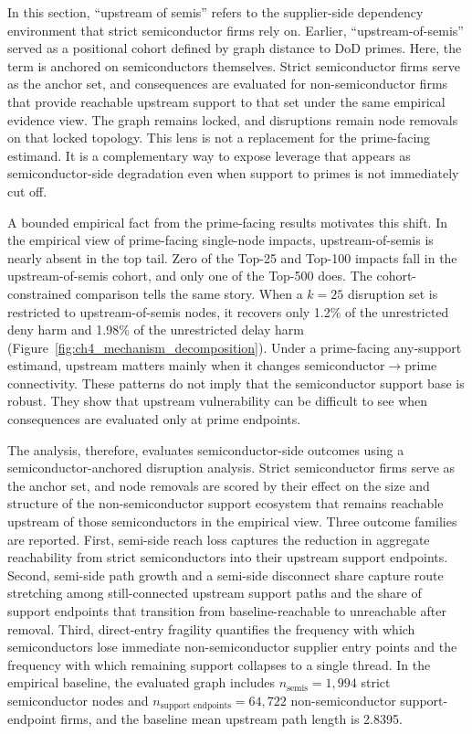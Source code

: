 In this section, ``upstream of semis'' refers to the supplier-side dependency environment that strict semiconductor firms rely on. Earlier, ``upstream-of-semis'' served as a positional cohort defined by graph distance to DoD primes. Here, the term is anchored on semiconductors themselves. Strict semiconductor firms serve as the anchor set, and consequences are evaluated for non-semiconductor firms that provide reachable upstream support to that set under the same empirical evidence view. The graph remains locked, and disruptions remain node removals on that locked topology. This lens is not a replacement for the prime-facing estimand. It is a complementary way to expose leverage that appears as semiconductor-side degradation even when support to primes is not immediately cut off.

A bounded empirical fact from the prime-facing results motivates this shift. In the empirical view of prime-facing single-node impacts, upstream-of-semis is nearly absent in the top tail. Zero of the Top-25 and Top-100 impacts fall in the upstream-of-semis cohort, and only one of the Top-500 does. The cohort-constrained comparison tells the same story. When a $k=25$ disruption set is restricted to upstream-of-semis nodes, it recovers only 1.2\% of the unrestricted deny harm and 1.98\% of the unrestricted delay harm (Figure~\ref{fig:ch4_mechanism_decomposition}). Under a prime-facing any-support estimand, upstream matters mainly when it changes semiconductor$\rightarrow$prime connectivity. These patterns do not imply that the semiconductor support base is robust. They show that upstream vulnerability can be difficult to see when consequences are evaluated only at prime endpoints.

The analysis, therefore, evaluates semiconductor-side outcomes using a semiconductor-anchored disruption analysis. Strict semiconductor firms serve as the anchor set, and node removals are scored by their effect on the size and structure of the non-semiconductor support ecosystem that remains reachable upstream of those semiconductors in the empirical view. Three outcome families are reported. First, semi-side reach loss captures the reduction in aggregate reachability from strict semiconductors into their upstream support endpoints. Second, semi-side path growth and a semi-side disconnect share capture route stretching among still-connected upstream support paths and the share of support endpoints that transition from baseline-reachable to unreachable after removal. Third, direct-entry fragility quantifies the frequency with which semiconductors lose immediate non-semiconductor supplier entry points and the frequency with which remaining support collapses to a single thread. In the empirical baseline, the evaluated graph includes $n_{\text{semis}}=1{,}994$ strict semiconductor nodes and $n_{\text{support endpoints}}=64{,}722$ non-semiconductor support-endpoint firms, and the baseline mean upstream path length is 2.8395.

